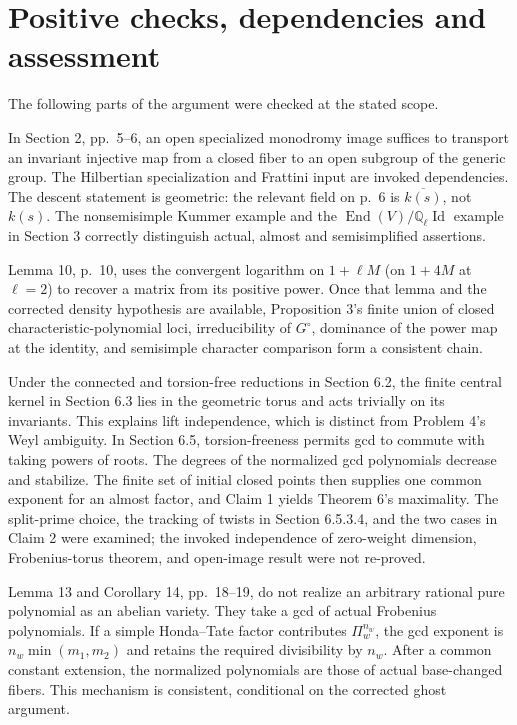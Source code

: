 \documentclass[10pt]{article}
\begin{document}
\section*{Positive checks, dependencies and assessment}
The following parts of the argument were checked at the stated scope.\par
In Section 2, pp. 5–6, an open specialized monodromy image suffices to transport an invariant injective map from a closed fiber to an open subgroup of the generic group. The Hilbertian specialization and Frattini input are invoked dependencies. The descent statement is geometric: the relevant field on p. 6 is \(\overline{k(s)}\), not \(k(s)\). The nonsemisimple Kummer example and the \(\operatorname{End}(V)/\mathbb Q_\ell\operatorname{Id}\) example in Section 3 correctly distinguish actual, almost and semisimplified assertions.\par
Lemma 10, p. 10, uses the convergent logarithm on \(1+\ell M\) (on \(1+4M\) at \(\ell=2\)) to recover a matrix from its positive power. Once that lemma and the corrected density hypothesis are available, Proposition 3’s finite union of closed characteristic-polynomial loci, irreducibility of \(G^\circ\), dominance of the power map at the identity, and semisimple character comparison form a consistent chain.\par
Under the connected and torsion-free reductions in Section 6.2, the finite central kernel in Section 6.3 lies in the geometric torus and acts trivially on its invariants. This explains lift independence, which is distinct from Problem 4’s Weyl ambiguity. In Section 6.5, torsion-freeness permits gcd to commute with taking powers of roots. The degrees of the normalized gcd polynomials decrease and stabilize. The finite set of initial closed points then supplies one common exponent for an almost factor, and Claim 1 yields Theorem 6’s maximality. The split-prime choice, the tracking of twists in Section 6.5.3.4, and the two cases in Claim 2 were examined; the invoked independence of zero-weight dimension, Frobenius-torus theorem, and open-image result were not re-proved.\par
Lemma 13 and Corollary 14, pp. 18–19, do not realize an arbitrary rational pure polynomial as an abelian variety. They take a gcd of actual Frobenius polynomials. If a simple Honda–Tate factor contributes \(\Pi_w^{n_w}\), the gcd exponent is \(n_w\min(m_1,m_2)\) and retains the required divisibility by \(n_w\). After a common constant extension, the normalized polynomials are those of actual base-changed fibers. This mechanism is consistent, conditional on the corrected ghost argument.\par
\end{document}
